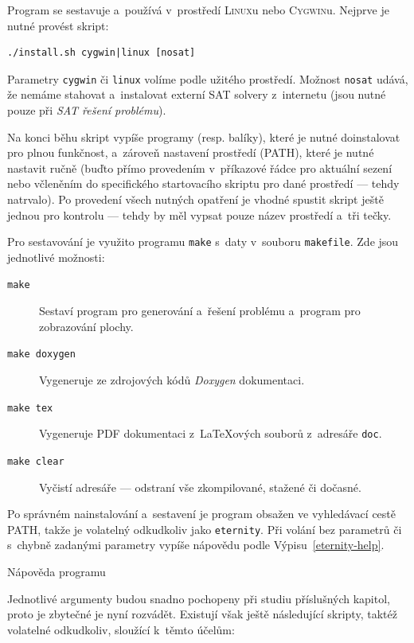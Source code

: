 \documentclass[11pt, titlepage]{report}
\begin{document}
Program se sestavuje a~používá v~prostředí \textsc{Linux}u nebo \textsc{Cygwin}u. Nejprve je nutné provést skript:

\begin{verbatim}
./install.sh cygwin|linux [nosat]
\end{verbatim}

Parametry \texttt{cygwin} či \texttt{linux} volíme podle užitého prostředí. Možnost \texttt{nosat} udává, že nemáme stahovat a~instalovat externí SAT solvery z~internetu (jsou nutné pouze při \emph{SAT řešení problému}).

Na konci běhu skript vypíše programy (resp. balíky), které je nutné doinstalovat pro plnou funkčnost, a~zároveň nastavení prostředí (\textsc{PATH}), které je nutné nastavit ručně (buďto přímo provedením v~příkazové řádce pro aktuální sezení nebo včleněním do specifického startovacího skriptu pro dané prostředí --- tehdy natrvalo). Po provedení všech nutných opatření je vhodné spustit skript ještě jednou pro kontrolu --- tehdy by měl vypsat pouze název prostředí a~tři tečky.

Pro sestavování je využito programu \texttt{make} s~daty v~souboru \texttt{makefile}. Zde jsou jednotlivé možnosti:

\begin{description}
\item[\texttt{make}] Sestaví program pro generování a~řešení problému a~program pro zobrazování plochy.
\item[\texttt{make doxygen}] Vygeneruje ze zdrojových kódů \emph{Doxygen} dokumentaci.
\item[\texttt{make tex}] Vygeneruje PDF dokumentaci z~{\LaTeX}ových souborů z~adresáře \texttt{doc}.
\item[\texttt{make clear}] Vyčistí adresáře --- odstraní vše zkompilované, stažené či dočasné.
\end{description}

Po správném nainstalování a~sestavení je program obsažen ve vyhledávací cestě \textsc{PATH}, takže je volatelný odkudkoliv jako \texttt{eternity}. Při volání bez parametrů či s~chybně zadanými parametry vypíše nápovědu podle Výpisu~\ref{eternity-help}.

\begin{output}

\caption{Nápověda programu}
\label{eternity-help}
\end{output}

Jednotlivé argumenty budou snadno pochopeny při studiu příslušných kapitol, proto je zbytečné je nyní rozvádět. Existují však ještě následující skripty, taktéž volatelné odkudkoliv, sloužící k~těmto účelům:
\end{document}
